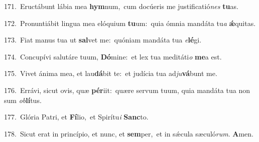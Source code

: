 {\numbfont\textcolor{\numbcolor}{171.}}~Eructábunt lábia mea \textbf{hym}\-num,~\star cum docúeris me justificatió\textit{nes} \textbf{tu}\-as.\par
{\numbfont\textcolor{\numbcolor}{172.}}~Pronuntiábit lingua mea elóquium \textbf{tu}\-um:~\star quia ómnia mandáta tu\textit{a} \textbf{ǽ}\-quitas.\par
{\numbfont\textcolor{\numbcolor}{173.}}~Fiat manus tua ut \textbf{sal}\-vet me:~\star quóniam mandáta tua \textit{e}\-\textbf{lé}gi.\par
{\numbfont\textcolor{\numbcolor}{174.}}~Concupívi salutáre tuum, \textbf{Dó}\-mine:~\star et lex tua meditáti\textit{o} \textbf{me}\-a est.\par
{\numbfont\textcolor{\numbcolor}{175.}}~Vivet ánima mea, et lau\-\textbf{dá}\-bit te:~\star et judícia tua ad\-\textit{ju}\-\textbf{vá}bunt me.\par
{\numbfont\textcolor{\numbcolor}{176.}}~Errávi, sicut ovis, quæ \textbf{pér}\-iit:~\star quære servum tuum, quia mandáta tua non sum \textit{ob}\-\textbf{lí}tus.\par
{\numbfont\textcolor{\numbcolor}{177.}}~Glória Patri, et \textbf{Fí}\-lio,~\star et Spirítu\textit{i} \textbf{Sanc}\-to.\par
{\numbfont\textcolor{\numbcolor}{178.}}~Sicut erat in princípio, et nunc, et \textbf{sem}\-per,~\star et in sǽcula sæculó\-\textit{rum}\-. \textbf{A}\-men.\par
